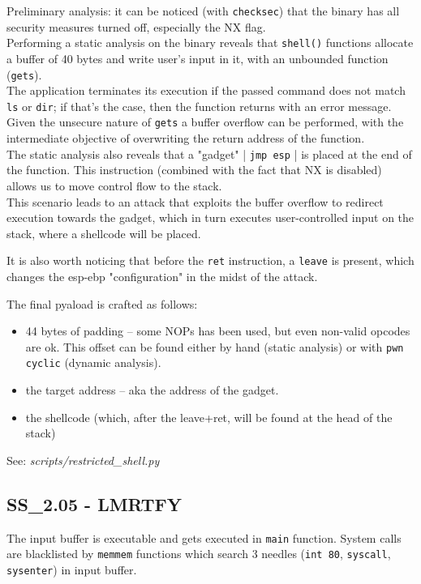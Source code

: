 Preliminary analysis: it can be noticed (with \texttt{checksec}) that the binary has all security measures turned off, especially the NX flag. \\
Performing a static analysis on the binary reveals that \texttt{shell()} functions allocate a buffer of 40 bytes and write user's input in it, with an unbounded function (\texttt{gets}). \\
The application terminates its execution if the passed command does not match \texttt{ls} or \texttt{dir}; if that's the case, then the function returns with an error message. \\

Given the unsecure nature of \texttt{gets} a buffer overflow can be performed, with the intermediate objective of overwriting the return address of the function. \\
The static analysis also reveals that a "gadget" | \texttt{jmp esp} | is placed at the end of the function. This instruction (combined with the fact that NX is disabled) allows us to move control flow to the stack. \\

This scenario leads to an attack that exploits the buffer overflow to redirect execution towards the gadget, which in turn executes user-controlled input on the stack, where a shellcode will be placed.

It is also worth noticing that before the \texttt{ret} instruction, a \texttt{leave} is present, which changes the esp-ebp "configuration" in the midst of the attack.

The final pyaload is crafted as follows:
\begin{itemize}
  \item 44 bytes of padding -- some NOPs has been used, but even non-valid opcodes are ok. This offset can be found either by hand (static analysis) or with \texttt{pwn cyclic} (dynamic analysis).
  \item the target address -- aka the address of the gadget.
  \item the shellcode (which, after the leave+ret, will be found at the head of the stack)
\end{itemize}

See: \textit{scripts/restricted_shell.py}

\subsection{SS_2.05 - LMRTFY}
The input buffer is executable and gets executed in \texttt{main} function.
System calls are blacklisted by \texttt{memmem} functions which search 3 needles (\texttt{int 80}, \texttt{syscall}, \texttt{sysenter}) in input buffer.

